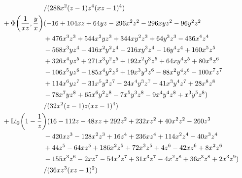 \documentclass[letter,11pt,DIV=12,abstract=true,numbers=noenddot,titlepage=false,twocolumn=false,draft=false]{scrartcl}
\begin{document}
\begin{equation}
\begin{split}
      & \qquad \qquad \qquad \quad /(288 x^2 (z-1) z^4 (x z-1)^4)\\
& \quad +  \Phi\bigg(\frac{1}{xz}, \frac{y}{x}\bigg) (-16 + 104 x z + 64 y z - 296 x^2 z^2 - 296 x y z^2 - 96 y^2 z^2\\
      & \qquad \qquad \qquad \quad + 476 x^3 z^3 + 544 x^2 y z^3 + 344 x y^2 z^3 + 64 y^3 z^3 - 436 x^4 z^4\\
      & \qquad \qquad \qquad \quad - 568 x^3 y z^4 - 416 x^2 y^2 z^4 - 216 x y^3 z^4 - 16 y^4 z^4 + 160 x^5 z^5\\
      & \qquad \qquad \qquad \quad + 326 x^4 y z^5 + 271 x^3 y^2 z^5 + 192 x^2 y^3 z^5 + 64 x y^4 z^5 + 80 x^6 z^6\\
      & \qquad \qquad \qquad \quad - 106 x^5 y z^6 - 185 x^4 y^2 z^6 + 19 x^3 y^3 z^6 - 88 x^2 y^4 z^6 - 100 x^7 z^7\\
      & \qquad \qquad \qquad \quad + 114 x^6 y z^7 - 31 x^5 y^2 z^7 - 24 x^4 y^3 z^7 + 41 x^3 y^4 z^7 + 28 x^8 z^8\\
      & \qquad \qquad \qquad \quad - 78 x^7 y z^8 + 65 x^6 y^2 z^8 - 7 x^5 y^3 z^8 - 9 x^4 y^4 z^8 + x^3 y^5 z^8)\\
      & \qquad \qquad \qquad \quad /(32 x^2 (z-1) z (x z-1)^4)\\
& \quad + \text{Li}_2 \bigg(1 - \frac{1}{z}\bigg) (16 - 112 z - 48 x z + 292 z^2 + 232 x z^2 + 40 x^2 z^2 - 260 z^3\\
      & \qquad \qquad \qquad \quad - 420 x z^3 - 128 x^2 z^3 + 16 z^4 + 236 x z^4 + 114 x^2 z^4 - 40 x^3 z^4\\
      & \qquad \qquad \qquad \quad + 44 z^5 - 64 x z^5 + 186 x^2 z^5 + 72 x^3 z^5 + 4 z^6 - 42 x z^6 + 8 x^2 z^6\\
      & \qquad \qquad \qquad \quad - 155 x^3 z^6 - 2 x z^7 - 54 x^2 z^7 + 31 x^3 z^7 - 4 x^2 z^8 + 36 x^3 z^8 + 2 x^3 z^9)\\
      & \qquad \qquad \qquad \quad/(36 x z^3 (x z-1)^2)\\
\notag
\end{split}
\end{equation}
\end{document}
